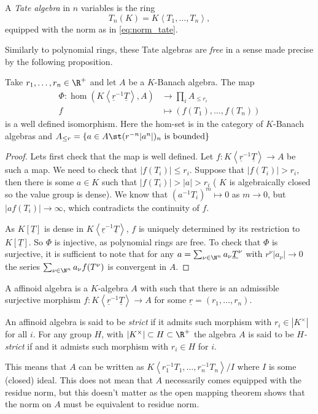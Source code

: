 \begin{definition}
	A \emph{Tate algebra} in $n$ variables is the ring \[
		T_n(K) = K\left<T_1, \ldots, T_n \right>
	,\]
	equipped with the norm as in \eqref{eq:norm_tate}.
\end{definition}

Similarly to polynomial rings, these Tate algebras are \emph{free} in a sense made precise by the following proposition. 
\begin{proposition}\label{prop:universal_property_tate_algebars}
	Take $r_1, \ldots, r_n \in \R^{ +}$ and let $A$ be a $K$-Banach algebra. 
	The map
	\begin{align*}
		\Phi: \hom(K\left<\underline r^{-1} \underline T \right>, A) &\longrightarrow \prod_i A_{\le r_i}  \\
		f &\longmapsto (f(T_1), \ldots, f(T_n))
	\end{align*}
	is a well defined isomorphism. 
	Here the hom-set is in the category of $K$-Banach algebras and $A_{\le r} = \{a \in A \st (r^{-n}|a^{n}|)_n \text{ is bounded}\} $
\end{proposition}
\begin{proof}
	Lets first check that the map is well defined. 
	Let $f: K\left<\underline r^{-1} \underline T \right> \to A$ be such a map. 
	We need to check that $|f(T_i)| \le r_i$. 
	Suppose that  $|f(T_i)| > r_i$, then there is some $a \in K$ such that $|f(T_i)| > |a| > r_i$ ( $K$ is algebraically closed so the value group is dense). 
	We know that $(a^{-1}T_i)^{m} \mapsto 0$ as $m \to 0$, but $|a f(T_i)| \to \infty $, which contradicts the continuity of $f$. 


	As $K[\underline T]$ is dense in $K\left<\underline r^{-1} \underline T \right>$, $f$ is uniquely determined by its restriction to $K[\underline T]$. So $\Phi$ is injective, as polynomial rings are free.
	To check that $\Phi$ is surjective, it is sufficient to note that for any $a = \sum_{\nu \in \N^{n}}^{} a_\nu \underline T^{\nu}$ with $r^{\nu} |a_\nu| \to 0$ the series $\sum_{\nu \in \N^{n}} a_\nu f(T^{\nu})$ is convergent in $A$. 
\end{proof}


\begin{definition}
	A affinoid algebra is a $K$-algebra $A$ with such that there is an admissible surjective morphism $f: K\left<\underline r ^{-1} \underline T \right> \to A$ for some $\underline r = (r_1, \ldots, r_n)$. 

	An affinoid algebra is said to be \emph{strict} if it admits such morphism with $r_i  \in |K^{\times }|$ for all $i$. 
	For any group $H$, with $|K^{\times }| \subset  H \subset \R^{ +}$ the algebra $A$ is said to be \emph{$H$-strict} if and it admists such morphism with $r_i \in H$ for $i$. 
\end{definition}
This means that $A$ can be written as $K\left<r_1^{-1}T_1, \ldots, r_n^{-1}T_n \right> / I$ where $I$ is some (closed) ideal.
This does not mean that $A$ necessarily comes equipped with the residue norm, but this doesn't matter as the open mapping theorem shows that the norm on $A$ must be equivalent to residue norm.


